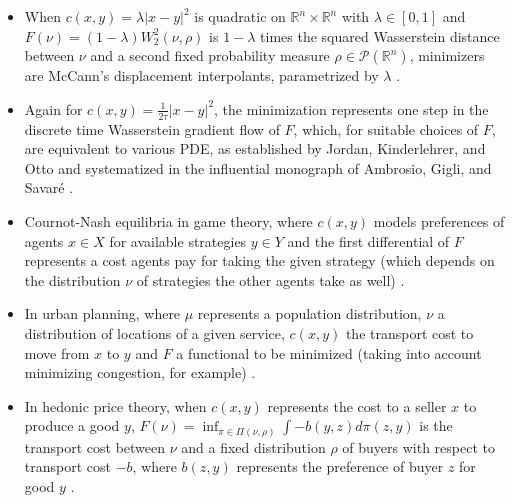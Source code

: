 \documentclass{scrartcl}
\theoremstyle{plain}
\theoremstyle{definition}
\begin{document}
\begin{itemize}
    \item When $c(x,y) =\lambda |x-y|^2$ is quadratic on $\mathbb{R}^n \times \mathbb{R}^n$ with $\lambda \in [0,1]$ and $F(\nu)=(1-\lambda)W_2^2(\nu,\rho)$ is $1-\lambda$ times the squared Wasserstein distance between $\nu$ and a second fixed probability measure $\rho \in \mathcal{P}(\mathbb{R}^n)$, minimizers are McCann's displacement interpolants, parametrized by $\lambda$ \cite{McCann1997}. 

    \item Again for $c(x,y) =\frac{1}{2\tau} |x-y|^2$, the minimization represents one step in the discrete time Wasserstein gradient flow of $F$, which, for suitable choices of $F$, are equivalent to various PDE, as established by Jordan, Kinderlehrer, and Otto \cite{jordan1998variational} and systematized in the influential monograph of Ambrosio, Gigli, and Savaré \cite{ambrosio2008gradient}.
 
    \item Cournot-Nash equilibria in game theory, where $c(x,y)$ models preferences of agents $x \in X$ for available strategies $y \in Y$ and the first differential of $F$ represents a cost agents pay for taking the given strategy (which depends on the distribution $\nu$ of strategies the other agents take as well) \cite{BlanchetCarlier2014, BlanchetCarlier2014a, BlanchetCarlier2016}.

    \item In urban planning, where $\mu$ represents a population distribution, $\nu$ a distribution of locations of a given service, $c(x,y)$ the transport cost to move from $x$ to $y$ and $F$ a functional to be minimized (taking into account minimizing congestion, for example) \cite{ButtazzoSantambrogio2005, CarlierSantambrogio2005}.

    \item In hedonic price theory, when $c(x,y)$ represents the cost to a seller $x$ to produce a good $y$, $F(\nu)=\inf_{\pi \in \Pi(\nu,\rho)}\int -b(y,z)d\pi(z,y)$ is the transport cost between $\nu$ and a fixed distribution $\rho$ of buyers with respect to transport cost $-b$, where $b(z,y)$ represents the preference of buyer $z$ for good $y$ \cite{COCV_2005__11_1_57_0}.
\end{itemize}
\end{document}
